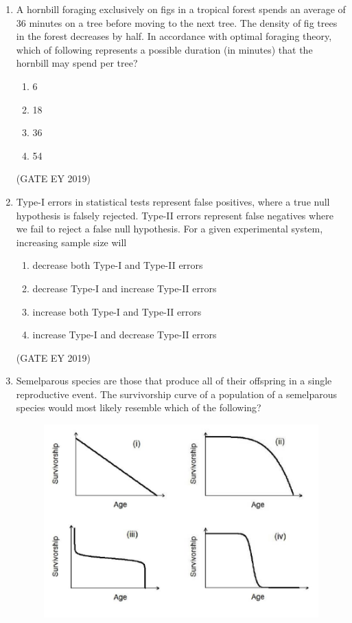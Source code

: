 \documentclass[journal,12pt,onecolumn]{IEEEtran}
\theoremstyle{remark}
\begin{document}
\begin{enumerate}[resume]
\item A hornbill foraging exclusively on figs in a tropical forest spends an average of 36 minutes on a tree before moving to the next tree. The density of fig trees in the forest decreases by half. In accordance with optimal foraging theory, which of following represents a possible duration (in minutes) that the hornbill may spend per tree?

\begin{multicols}{2}
\begin{enumerate}
\item 6
\item 18
\item 36
\item 54
\end{enumerate}
\end{multicols}
\hfill{(GATE EY 2019)}
\item Type-I errors in statistical tests represent false positives, where a true null hypothesis is falsely rejected. Type-II errors represent false negatives where we fail to reject a false null hypothesis. For a given experimental system, increasing sample size will

\begin{multicols}{2}
\begin{enumerate}
\item decrease both Type-I and Type-II errors
\item decrease Type-I and increase Type-II errors
\item increase both Type-I and Type-II errors
\item increase Type-I and decrease Type-II errors
\end{enumerate}
\end{multicols}

\hfill{(GATE EY 2019)}
\item Semelparous species are those that produce all of their offspring in a single reproductive event. The survivorship curve of a population of a semelparous species would most likely resemble which of the following?
\begin{figure}[H]
    \centering
    \includegraphics[]{figs/41.png}
\end{figure}


\end{enumerate}
\end{document}
